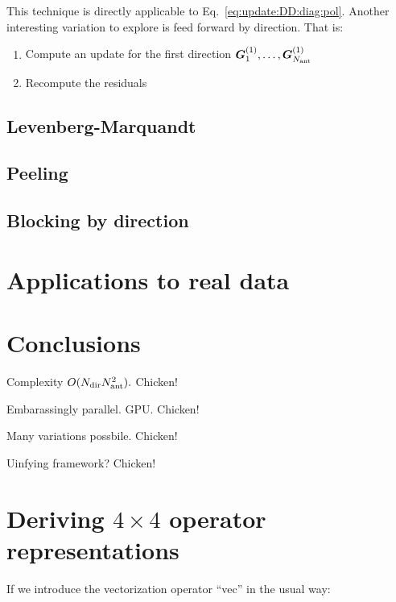 \documentclass[useAMS,usenatbib]{mn2e}
\newcommand{\mat}[1]{{\bmath{#1}}}
\newcommand{\GG}{\mat{G}}
\begin{document}
This technique is directly applicable to Eq.~\ref{eq:update:DD:diag:pol}. Another interesting variation to 
explore is feed forward by direction. That is:

\begin{enumerate}
\item Compute an update for the first direction $\GG^{(1)}_1,\dots,\GG^{(1)}_{\Na}$
\item Recompute the residuals

\end{enumerate}

\subsection{Levenberg-Marquandt}

\subsection{Peeling}

\subsection{Blocking by direction}


\section{Applications to real data}


\label{sec:realdata}

\section*{Conclusions}

Complexity $O(N_\mathrm{dir}N_\mathrm{ant}^2).$ Chicken!

Embarassingly parallel. GPU. Chicken!

Many variations possbile. Chicken!

Uinfying framework? Chicken!




\appendix

\section{Deriving $4\times4$ operator representations}
\label{sec:4x4app}

If we introduce the vectorization operator ``vec'' in the usual way:
\end{document}
